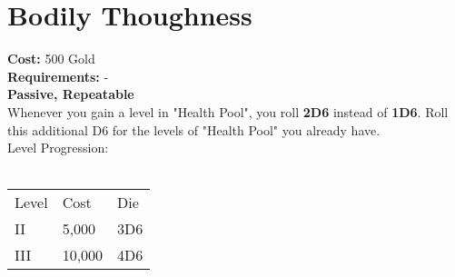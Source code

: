 \section{Bodily Thoughness}\label{sec:bodilythoughness}
\textbf{Cost:} 500 Gold\\
\textbf{Requirements:} -\\
\textbf{Passive, Repeatable}\\
Whenever you gain a level in "Health Pool", you roll \textbf{2D6} instead of \textbf{1D6}.
Roll this additional D6 for the levels of "Health Pool" you already have.
\\
Level Progression:\\
\\
\begin{tabular}{l | l | l }
    Level & Cost & Die\\
    II & 5,000 & 3D6 \\
    III & 10,000 & 4D6\\
\end{tabular}